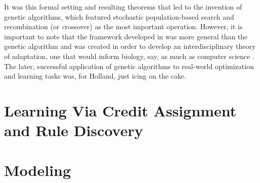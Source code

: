 \documentclass{sig-alternate}
\begin{document}
It was this formal setting and resulting theorems that led to the
invention of genetic algorithms, which featured stochastic population-based
search and recombination (or {\emph crossover}) as the most important
operation.  However, it is important to note that
the framework developed in \cite{ANAS} was more general than the
genetic algorithm and was created in order to develop an
interdisciplinary theory of adaptation, one that would inform biology,
say, as much as computer science \cite{ChristiansenFeldmanPaper}.  The
later, successful application of genetic algorithms to real-world
optimization and learning tasks was, for Holland, just icing on the
cake.

\section{Learning Via Credit Assignment and Rule Discovery}

\section{Modeling}
\end{document}
